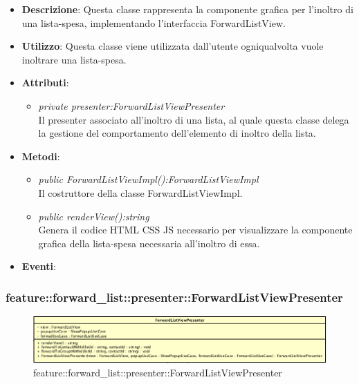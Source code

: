 \begin{itemize}
\item \textbf{Descrizione}: Questa classe rappresenta la componente grafica per l'inoltro di una lista-spesa, implementando l'interfaccia ForwardListView.
\item \textbf{Utilizzo}: Questa classe viene utilizzata dall'utente ogniqualvolta vuole inoltrare una lista-spesa.
\item \textbf{Attributi}:
\begin{itemize}
\item \textit{private presenter:ForwardListViewPresenter}\\
Il presenter associato all'inoltro di una lista, al quale questa classe delega la gestione del comportamento dell'elemento di inoltro della lista.
\end{itemize}
\item \textbf{Metodi}: 
	\begin{itemize}
	\item \textit{public ForwardListViewImpl():ForwardListViewImpl}\\
	Il costruttore della classe ForwardListViewImpl.
	\item \textit{public renderView():string}\\
		Genera il codice HTML CSS JS necessario per visualizzare la componente grafica della lista-spesa necessaria all'inoltro di essa.
	\end{itemize}
\item \textbf{Eventi}:
\end{itemize}

\subsubsection{feature::forward\_list::presenter::ForwardListViewPresenter}

\label{feature::forward_list::presenter::ForwardListViewPresenter}
\begin{figure}[H]
	\centering
	\includegraphics[scale=0.5]{Sezioni/SottosezioniST/img/app/ForwardListViewPresenter.png}
	\caption{feature::forward\_list::presenter::ForwardListViewPresenter}
\end{figure}

